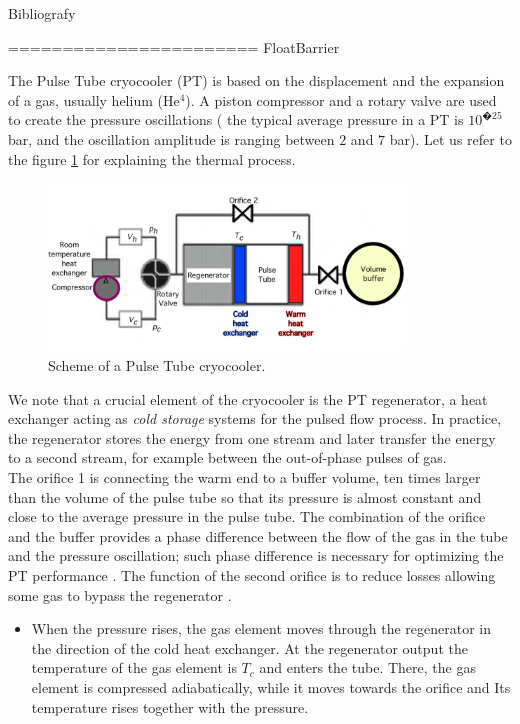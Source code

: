 Bibliografy



=======================
FloatBarrier
 {The Pulse Tube cryocooler (PT) is based on the displacement and the expansion of a gas, usually helium (He$^4$).  A piston compressor and a rotary valve  are used to create the pressure oscillations ( the typical average pressure in a PT is $10^{�25}$ bar, and the oscillation amplitude is ranging between $2$ and  $7$ bar). Let us refer to the figure \ref{fig:PT_scheme} for explaining the thermal process.
\begin{figure}[H]
	\begin{center}
		\includegraphics[width=9.5cm]{./Sec_SiteInfra/Figures/PT_scheme.pdf}
		\caption{Scheme of a Pulse Tube cryocooler.}
		\label{fig:PT_scheme}
	\end{center}
\end{figure}
We note that  a crucial element of the cryocooler is the  PT regenerator,  a heat exchanger acting as {\it cold storage} systems for the  pulsed flow process.   In practice, the regenerator  stores the energy from one stream and later transfer the energy to a second stream, for example between the out-of-phase pulses of gas. \\
The orifice 1  is connecting  the warm end  to a buffer volume, ten times larger than the volume of the pulse tube so that its pressure is almost constant and close to the average pressure in the pulse tube. The combination of the orifice and the buffer provides a phase difference between the flow of the gas in the tube and the pressure oscillation; such phase difference is necessary for optimizing the PT performance \cite{Mikulin}. The function of the second orifice  is to reduce losses allowing some gas to bypass the regenerator \cite{Zhu} .
\begin{itemize}
\item{When the pressure rises, the gas element moves through the regenerator in the direction of the cold heat exchanger. At the regenerator output  the temperature of the gas element is $T_c$ and enters the tube. There, the gas element is compressed adiabatically, while it moves towards the orifice and  Its temperature rises together with the pressure.}

\end{itemize}}
